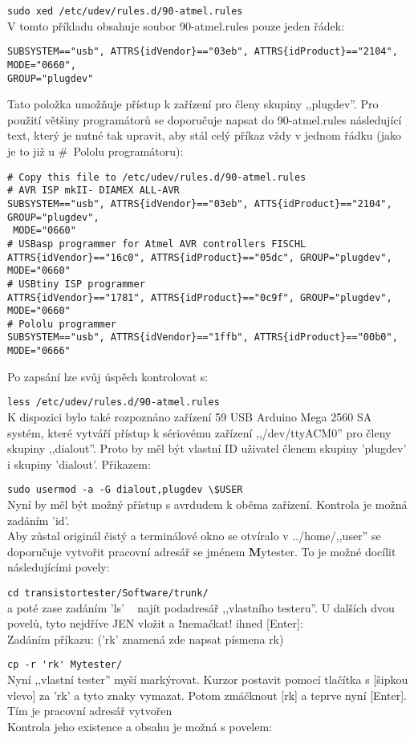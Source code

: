 \verb"sudo xed /etc/udev/rules.d/90-atmel.rules"\\
V tomto příkladu obsahuje soubor 90-atmel.rules pouze jeden řádek:
\begin{verbatim}
SUBSYSTEM=="usb", ATTRS{idVendor}=="03eb", ATTRS{idProduct}=="2104", MODE="0660",
GROUP="plugdev"
\end{verbatim}
Tato položka umožňuje přístup k zařízení pro členy skupiny ,,plugdev''.
Pro použití většiny programátorů se doporučuje napsat do 90-atmel.rules následující text,
který je nutné tak upravit, aby stál celý příkaz vždy v jednom řádku
(jako je to již u \#~Pololu programátoru):
\begin{verbatim}
# Copy this file to /etc/udev/rules.d/90-atmel.rules
# AVR ISP mkII- DIAMEX ALL-AVR
SUBSYSTEM=="usb", ATTRS{idVendor}=="03eb", ATTS{idProduct}=="2104", GROUP="plugdev",
 MODE="0660"
# USBasp programmer for Atmel AVR controllers FISCHL
ATTRS{idVendor}=="16c0", ATTRS{idProduct}=="05dc", GROUP="plugdev", MODE="0660"
# USBtiny ISP programmer
ATTRS{idVendor}=="1781", ATTRS{idProduct}=="0c9f", GROUP="plugdev", MODE="0660"
# Pololu programmer
SUBSYSTEM=="usb", ATTRS{idVendor}=="1ffb", ATTRS{idProduct}=="00b0", MODE="0666"
\end{verbatim}
Po zapsání lze svůj úspěch kontrolovat s:

\verb"less /etc/udev/rules.d/90-atmel.rules"\\
K dispozici bylo také rozpoznáno zařízení 59 USB Arduino Mega 2560 SA systém, které vytváří přístup
k sériovému zařízení ,,/dev/ttyACM0'' pro členy skupiny ,,dialout''.
Proto by měl být vlastní ID uživatel členem skupiny 'plugdev' i skupiny 'dialout'. Přikazem:

\verb"sudo usermod -a -G dialout,plugdev \$USER"\\
Nyní by měl být možný přístup s avrdudem k oběma zařízení.
Kontrola je možná zadáním 'id'.\\
Aby zůstal originál čistý a terminálové okno se otvíralo v ../home/,,user'' se doporučuje vytvořit pracovní adresář se jménem {\textbf Mytester}.
To je možné docílit následujícími povely:

\verb"cd transistortester/Software/trunk/"\\
a poté zase zadáním 'ls'   ~ najít podadresář ,,vlastního testeru''.
U dalších dvou povelů, tyto nejdříve JEN vložit a {\textbf !nemačkat!} ihned [Enter]:\\
Zadáním příkazu: ('rk' znamená zde napsat písmena rk)

\verb"cp -r 'rk' Mytester/"\\
Nyní ,,vlastní tester'' myší markýrovat. Kurzor postavit pomocí tlačítka s [šipkou vlevo] za 'rk' a tyto znaky vymazat. Potom zmáčknout [rk] a teprve nyní [Enter]. Tím je pracovní adresář vytvořen\\
Kontrola jeho existence a obsahu je možná s povelem:

